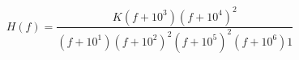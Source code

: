 \begin{enumerate}[label=\thesection.\arabic*.,ref=\thesection.\theenumi]
\begin{align}
	H(f) = \dfrac{K(f+10^{3})(f+10^{4})^{2}}{(f+10^{1})(f+10^{2})^{2}(f+10^{5})^{2}(f+10^{6})1}
\end{align}
\\

\end{enumerate}
